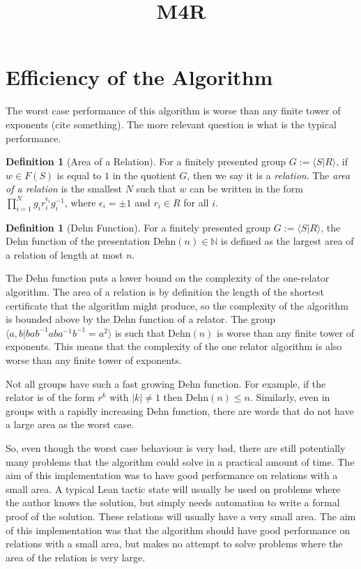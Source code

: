 \documentclass[11pt]{article} %
\title{M4R}
\theoremstyle{definition}
\theoremstyle{definition}
\theoremstyle{definition}
\theoremstyle{definition}
\theoremstyle{definition}
\newtheorem{defn}[theorem]{Definition}
\theoremstyle{definition}
\begin{document}
\section{Efficiency of the Algorithm}

The worst case performance of this algorithm is worse than any finite tower of exponents
(cite something). The more relevant question is what is the typical performance.

\begin{defn}[Area of a Relation]
For a finitely presented group $G := \langle S | R\rangle$, if $w \in F(S)$ is equal
to $1$ in the quotient $G$, then we say it is a \textit{relation}.
The \textit{area of a relation} is the smallest $N$ such that $w$ can be written
in the form $\prod_{i=1}^N g_i r_i^{\epsilon_i} g_i^{-1}$, where $\epsilon_i = \pm 1$
and $r_i \in R$ for all $i$.
\end{defn}

\begin{defn}[Dehn Function]
For a finitely presented group $G := \langle S | R\rangle$, the Dehn function
of the presentation $\text{Dehn}(n) \in \mathbb{N}$ is defined as the
largest area of a relation of length at most $n$.
\end{defn}

The Dehn function puts a lower bound on the complexity of the one-relator algorithm.
The area of a relation is by definition the length of the shortest certificate
that the algorithm might produce, so the complexity of the algorithm is bounded above by
the Dehn function of a relator.
The group $\langle a, b | b a b^{-1} a b a^{-1} b^{-1} = a^2\rangle$ is such that
$\text{Dehn}(n)$ is worse than any finite tower of exponents. This means that the
complexity of the one relator algorithm is also worse than any finite tower of
exponents.

Not all groups have such a fast growing Dehn function. For example, if the relator
is of the form $r^k$ with $|k| \ne 1$ then $\text{Dehn}(n) \le n$.
Similarly, even in groups with a rapidly increasing Dehn function,
there are words that do not have a large area as the worst case.

So, even though the worst case behaviour is very bad, there are still potentially many
problems that the algorithm could solve in a practical amount of time. The aim of this
implementation was to have good performance on relations with a small area.
A typical Lean tactic state will usually be used on problems where the author knows
the solution, but simply needs automation to write a formal proof of the solution.
These relations will usually have a very small area. The aim of this implementation
was that the algorithm should have good performance on relations with a small area,
but makes no attempt to solve problems where the area of the relation is very large.
\end{document}
